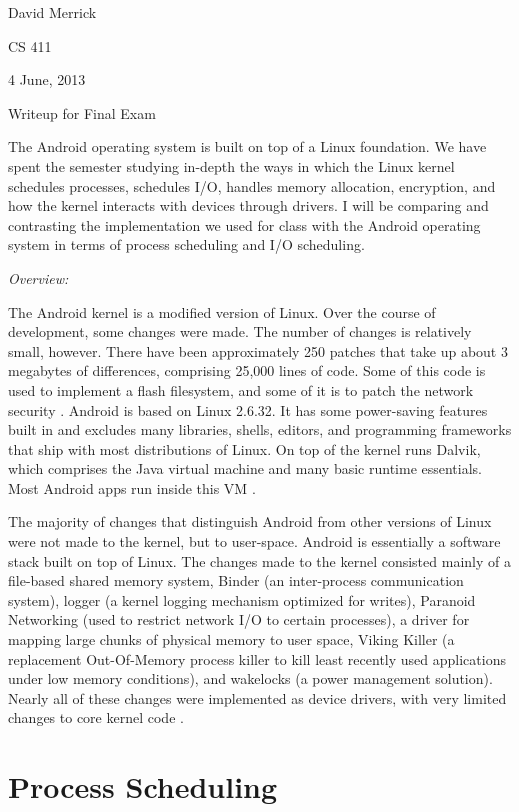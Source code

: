 \documentclass[letterpaper,10pt,titlepage]{article}
\newcommand{\tab}{\hspace*{2em}} %
\def\name{David Merrick}
\def\project{Final Exam}
\def\date{4 June, 2013}
\begin{document}
\name

CS 411

\date

\begin{center}
{\LARGE Writeup for \project}
\end{center}

\tab The Android operating system is built on top of a Linux foundation. We have spent the semester studying in-depth the ways in which the Linux kernel schedules processes, schedules I/O, handles memory allocation, encryption, and how the kernel interacts with devices through drivers. I will be comparing and contrasting the implementation we used for class with the Android operating system in terms of process scheduling and I/O scheduling.

\emph{Overview:} 

\tab The Android kernel is a modified version of Linux. Over the course of development, some changes were made. The number of changes is relatively small, however. There have been approximately 250 patches that take up about 3 megabytes of differences, comprising 25,000 lines of code. Some of this code is used to implement a flash filesystem, and some of it is to patch the network security \cite{features}. Android is based on Linux 2.6.32. It has some power-saving features built in and excludes many libraries, shells, editors, and programming frameworks that ship with most distributions of Linux. On top of the kernel runs Dalvik, which comprises the Java virtual machine and many basic runtime essentials. Most Android apps run inside this VM \cite{Bray}.

\tab The majority of changes that distinguish Android from other versions of Linux were not made to the kernel, but to user-space. Android is essentially a software stack built on top of Linux. The changes made to the kernel consisted mainly of a file-based shared memory system, Binder (an inter-process communication system), logger (a kernel logging mechanism optimized for writes), Paranoid Networking (used to restrict network I/O to certain processes), a driver for mapping large chunks of physical memory to user space, Viking Killer (a replacement Out-Of-Memory process killer to kill least recently used applications under low memory conditions), and wakelocks (a power management solution). Nearly all of these changes were implemented as device drivers, with very limited changes to core kernel code \cite{Forbes}.

\newpage
\section{Process Scheduling}
\end{document}
